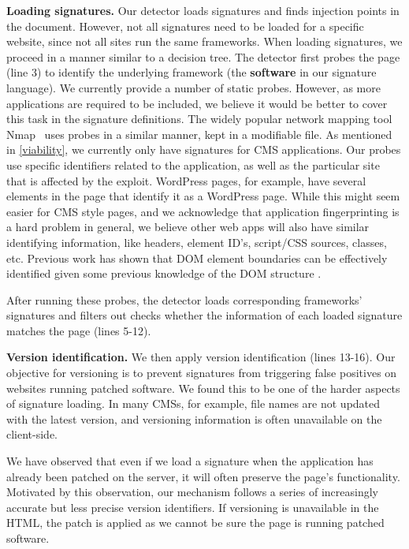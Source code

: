 \textbf{Loading signatures.}
Our detector loads signatures and finds injection points in the document. However, not all signatures need to be loaded for a specific website, since not all sites run the same frameworks. When loading signatures, we proceed in a manner similar to a decision tree. The detector first probes the page (line 3) to identify the underlying framework (the \textbf{software} in our signature language). We currently provide a number of static probes. However, as more applications are required to be included, we believe it would be better to cover this task in the signature definitions. The widely popular network mapping tool Nmap~\cite{nMap} uses probes in a similar manner, kept in a modifiable file. As mentioned in \autoref{viability}, we currently only have signatures for CMS applications. Our probes use specific identifiers related to the application, as well as the particular site that is affected by the exploit. WordPress pages, for example, have several elements in the page that identify it as a WordPress page. While this might seem easier for CMS style pages, and we acknowledge that application fingerprinting is a hard problem in general, we believe other web apps will also have similar identifying information, like headers, element ID's, script/CSS sources, classes, etc. Previous work has shown that DOM element boundaries can be effectively identified given some previous knowledge of the DOM structure \cite{10.1145/1595696.1595711}.

After running these probes, the detector loads corresponding frameworks' signatures and filters out checks whether the information of each loaded signature matches the page (lines 5-12).

\textbf{Version identification.} We then apply version identification
(lines 13-16). Our objective for versioning is to prevent signatures from
triggering false positives on websites running patched software. We
found this to be one of the harder aspects of signature loading. In
many \acp{CMS}, for example, file names are not updated with the
latest version, and versioning information is often unavailable on the client-side.

We have observed that even if we load a signature when the
application has already been patched on the server, it will often
preserve the page's functionality. Motivated by this observation, our mechanism
follows a series of increasingly accurate but less precise version
identifiers.
If versioning is unavailable in the HTML, the patch is applied
as we cannot be sure the page is running patched
software. %


